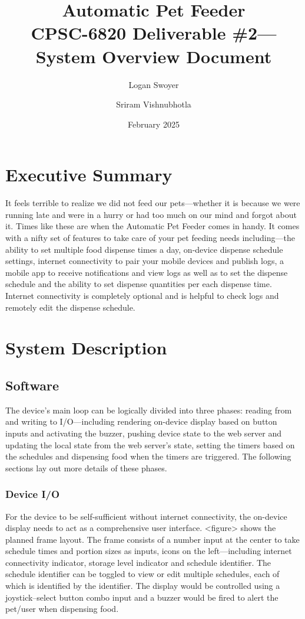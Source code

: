 \documentclass{article}
\title{Automatic Pet Feeder\\
\large CPSC-6820 Deliverable \#2---System Overview Document}
\author{Logan Swoyer \and Sriram Vishnubhotla}
\date{February 2025}
\begin{document}
\maketitle

\section{Executive Summary}
It feels terrible to realize we did not feed our pets---whether it is because we were running late and were in a hurry or had too much on our mind and forgot about it. Times like these are when the Automatic Pet Feeder comes in handy. It comes with a nifty set of features to take care of your pet feeding needs including---the ability to set multiple food dispense times a day, on-device dispense schedule settings, internet connectivity to pair your mobile devices and publish logs, a mobile app to receive notifications and view logs as well as to set the dispense schedule and the ability to set dispense quantities per each dispense time. Internet connectivity is completely optional and is helpful to check logs and remotely edit the dispense schedule.

\section{System Description}
\subsection{Software}
The device's main loop can be logically divided into three phases: reading from and writing to I/O---including rendering on-device display based on button inputs and activating the buzzer, pushing device state to the web server and updating the local state from the web server's state, setting the timers based on the schedules and dispensing food when the timers are triggered. The following sections lay out more details of these phases.
\subsubsection{Device I/O}
For the device to be self-sufficient without internet connectivity, the on-device display needs to act as a comprehensive user interface. <figure> shows the planned frame layout. The frame consists of a number input at the center to take schedule times and portion sizes as inputs, icons on the left---including internet connectivity indicator, storage level indicator and schedule identifier. The schedule identifier can be toggled to view or edit multiple schedules, each of which is identified by the identifier. The display would be controlled using a joystick--select button combo input and a buzzer would be fired to alert the pet/user when dispensing food.
\end{document}
